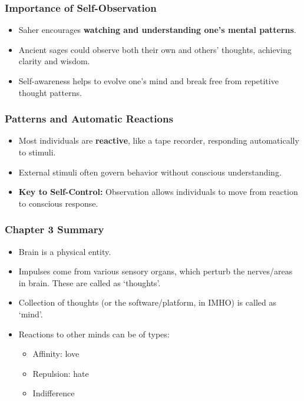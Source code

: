\begin{frame}[fragile]\frametitle{Importance of Self-Observation}

\begin{itemize}
    \item Saher encourages \textbf{watching and understanding one's mental patterns}.
    \item Ancient sages could observe both their own and others' thoughts, achieving clarity and wisdom.
    \item Self-awareness helps to evolve one's mind and break free from repetitive thought patterns.
\end{itemize}
\end{frame}

\begin{frame}[fragile]\frametitle{Patterns and Automatic Reactions}

\begin{itemize}
    \item Most individuals are \textbf{reactive}, like a tape recorder, responding automatically to stimuli.
    \item External stimuli often govern behavior without conscious understanding.
    \item \textbf{Key to Self-Control:} Observation allows individuals to move from reaction to conscious response.
\end{itemize}
\end{frame}



\begin{frame}[fragile]\frametitle{Chapter 3 Summary}
	\begin{itemize}
	\item Brain is a physical entity.
	\item Impulses come from various sensory organs, which perturb the nerves/areas in brain. These are called as `thoughts'.
	\item Collection of thoughts (or the software/platform, in IMHO) is called as `mind'.
	\item Reactions to other minds can be of types:
		\begin{itemize}
			\item Affinity: love
			\item Repulsion: hate
			\item Indifference
		\end{itemize}
	\end{itemize}

\end{frame}




